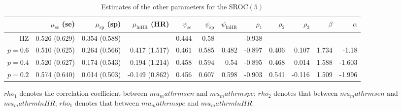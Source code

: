 \begin{table}[!htb]

\caption{\label{tab:sroc-ki67-5}Estimates of the other parameters for the SROC$(5)$}
\centering
\begin{threeparttable}
\begin{tabular}[t]{rrrrrrrrrrrr}
\toprule
 & $\mu_\mathrm{se}$ (se) & $\mu_\mathrm{sp}$ (sp) & $\mu_\mathrm{lnHR}$ (HR) & $\psi_\mathrm{se}$ & $\psi_\mathrm{sp}$ & $\psi_\mathrm{lnHR}$ & $\rho_1$ & $\rho_2$ & $\rho_3$ & $\beta$ & $\alpha$\\
\midrule
HZ & 0.526 (0.629) & 0.354 (0.588) &  & 0.444 & 0.58 &  & -0.938 &  &  &  & \\
$p=0.6$ & 0.510 (0.625) & 0.264 (0.566) & 0.417 (1.517) & 0.461 & 0.585 & 0.482 & -0.897 & 0.406 & 0.107 & 1.734 & -1.18\\
$p=0.4$ & 0.520 (0.627) & 0.174 (0.543) & 0.194 (1.214) & 0.458 & 0.594 & 0.54 & -0.895 & 0.468 & 0.014 & 1.588 & -1.603\\
$p=0.2$ & 0.574 (0.640) & 0.014 (0.503) & -0.149 (0.862) & 0.456 & 0.607 & 0.598 & -0.903 & 0.541 & -0.116 & 1.509 & -1.996\\
\bottomrule
\end{tabular}
\begin{tablenotes}
\item 
			$rho_1$ denotes the correlation coefficient between $mu_mathrm{sen}$ and $mu_mathrm{spe}$;
			$rho_2$ denotes that between $mu_mathrm{sen}$ and $mu_mathrm{lnHR}$;
			$rho_1$ denotes that between $mu_mathrm{spe}$ and $mu_mathrm{lnHR}$.
\end{tablenotes}
\end{threeparttable}
\end{table}
